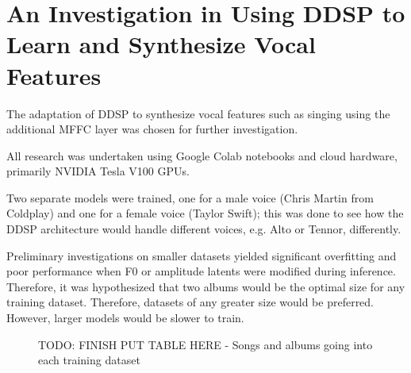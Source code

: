 \chapter{An Investigation in Using DDSP to Learn and Synthesize Vocal Features}

The adaptation of DDSP to synthesize vocal features such as singing using the additional MFFC layer was chosen for further investigation.

All research was undertaken using Google Colab notebooks and cloud hardware, primarily NVIDIA Tesla V100 GPUs.

Two separate models were trained, one for a male voice (Chris Martin from Coldplay) and one for a female voice (Taylor Swift); this was done to see how the DDSP architecture would handle different voices, e.g. Alto or Tennor, differently.

Preliminary investigations on smaller datasets yielded significant overfitting and poor performance when F0 or amplitude latents were modified during inference. Therefore, it was hypothesized that two albums would be the optimal size for any training dataset. Therefore, datasets of any greater size would be preferred. However, larger models would be slower to train.

\begin{figure}[H]
    \centering
    \caption{TODO: FINISH PUT TABLE HERE - Songs and albums going into each training dataset}
\end{figure}





